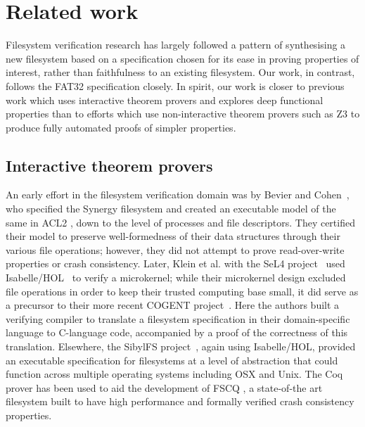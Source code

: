 \documentclass[submission,copyright,creativecommons]{eptcs}
\begin{document}
\section{Related work}

Filesystem verification research has largely followed a pattern of
synthesising a new filesystem based on a specification chosen for its
ease in proving properties of interest, rather than faithfulness to an
existing filesystem. Our work, in contrast, follows the FAT32
specification closely. In spirit, our work is closer to previous work
which uses interactive theorem provers and explores deep functional
properties than to efforts which use non-interactive theorem provers
such as Z3 to produce fully automated proofs of simpler properties.

\subsection{Interactive theorem provers}
An early effort in the filesystem verification domain was by Bevier
and Cohen~\cite{bevier1996executable}, who specified the Synergy
filesystem and created an executable model of the same in ACL2
\cite{kaufmann2000}, down to the level of processes
and file descriptors. They certified their model
to preserve well-formedness of their data structures through their
various file operations; however, they did not attempt to prove
read-over-write properties or crash consistency. Later,
Klein et al. with the SeL4 project~\cite{klein2009sel4} used
Isabelle/HOL~\cite{nipkow2002isabelle} to verify a microkernel;
while their microkernel design excluded file operations in order to keep
their trusted computing base small, it did serve as a precursor to their
more recent COGENT project~\cite{amani2016cogent}. Here the authors
built a verifying compiler to translate a filesystem specification in
their domain-specific language to C-language code, accompanied by
a proof of the correctness of this translation. Elsewhere, the SibylFS
project~\cite{ridge2015sibylfs}, again using Isabelle/HOL, provided
an executable specification for filesystems at a level of abstraction
that could function across multiple operating systems including OSX
and Unix. The Coq prover \cite{bertot2013interactive} has been used to
aid the development of FSCQ \cite{DBLP:conf/usenix/ChenZCCKZ16}, a
state-of-the art filesystem built to have high performance and
formally verified crash consistency properties.
\end{document}
